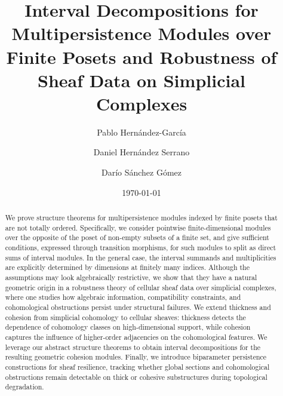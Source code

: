 \documentclass[reqno,12pt]{amsart}
\newcommand{\0}{\mathbf 0}
\theoremstyle{definition}
\begin{document}
\title[Intervals for Multipersistence and Sheaf Data]{Interval Decompositions for Multipersistence Modules over Finite Posets and Robustness of Sheaf Data on Simplicial Complexes}


\date{\today}




\author[P. Hern\'andez-Garc\'ia]{Pablo Hern\'andez-Garc\'ia}
\author[D. Hern\'andez Serrano]{Daniel Hern\'andez Serrano}
\author[D. S\'anchez G\'omez]{Dar\'io S\'anchez G\'omez}

\address{Departamento de Matem\'aticas and Instituto Universitario de F\'isica Fundamental y Matem\'aticas (IUFFyM), Universidad de Salamanca, Salamanca, Spain}



\begin{abstract}
We prove structure theorems for multipersistence modules indexed by finite posets that are not totally ordered. Specifically, we consider pointwise finite-dimensional modules over the opposite of the poset of non-empty subsets of a finite set, and give sufficient conditions, expressed through transition morphisms, for such modules to split as direct sums of interval modules. In the general case, the interval summands and multiplicities are explicitly determined by dimensions at finitely many indices. Although the assumptions may look algebraically restrictive, we show that they have a natural geometric origin in a robustness theory of cellular sheaf data over simplicial complexes, where one studies how algebraic information, compatibility constraints, and cohomological obstructions persist under structural failures. We extend thickness and cohesion from simplicial cohomology to cellular sheaves: thickness detects the dependence of cohomology classes on high-dimensional support, while cohesion captures the influence of higher-order adjacencies on the cohomological features. We leverage our abstract structure theorems to obtain interval decompositions for the resulting geometric cohesion modules. Finally, we introduce biparameter persistence constructions for sheaf resilience, tracking whether global sections and cohomological obstructions remain detectable on thick or cohesive substructures during topological degradation.
\end{abstract}
\end{document}
